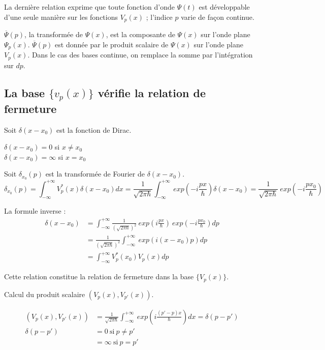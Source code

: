 \documentclass[12pt,a4paper,titlepage]{book}
\begin{document}
La dernière relation exprime que toute fonction d'onde $\Psi (t)$ est développable d'une seule manière sur les fonctions $V_p (x)$ ; l'indice $p$ varie de façon continue.

$\overline{\Psi} (p)$, la transformée de $\Psi (x)$, est la composante de $\Psi (x)$ sur l'onde plane $\Psi_p (x)$. $\overline{\Psi} (p)$ est donnée par le produit scalaire de $\Psi (x)$ sur l'onde plane $V_p (x)$. Dans le cas des bases continue, on remplace la somme par l'intégration sur $dp$.

\subsection{La base $\lbrace v_p (x) \rbrace$ vérifie la relation de fermeture}

Soit $\delta (x-x_0)$ est la fonction de Dirac.
\begin{center}
$\delta (x-x_0) = 0$ si $x \neq x_0$\\
$\delta (x-x_0) = \infty$ si $x = x_0$
\end{center}

Soit $\delta_{x_0} (p)$ est la transformée de Fourier de $\delta (x-x_0)$.
\begin{equation*}
\delta_{x_0} (p) = \int_{- \infty}^{+ \infty} V_p^* (x) \delta (x-x_0) dx = \frac{1}{\sqrt{2 \pi \hbar}} \int_{- \infty}^{+ \infty} ~exp \left( -i \frac{px}{\hbar} \right) \delta (x-x_0) = \frac{1}{\sqrt{2 \pi \hbar}} ~exp \left( -i \frac{px_0}{\hbar} \right)
\end{equation*}

La formule inverse :
\begin{align*}
\delta (x-x_0) &= \int_{- \infty}^{+ \infty} \frac{1}{(\sqrt{2 \pi \hbar})^2} ~exp \left( i \frac{px}{\hbar} \right) ~exp \left( -i \frac{px_0}{\hbar} \right) dp \\
&= \frac{1}{(\sqrt{2 \pi \hbar})^2} \int_{- \infty}^{+ \infty} ~exp \left( i (x-x_0)p \right) dp\\
&= \int_{- \infty}^{+ \infty} V_p^* (x_0) V_p (x) dp
\end{align*}

Cette relation constitue la relation de fermeture dans la base $\lbrace V_p (x) \rbrace$.

Calcul du produit scalaire $\left( V_p (x), V_{p'} (x) \right)$.

\begin{align*}
\left( V_p (x), V_{p'} (x) \right) &= \frac{1}{\sqrt{2 \pi \hbar}} \int_{- \infty}^{+ \infty} ~exp \left( i \frac{(p'-p)x}{\hbar} \right) dx = \delta (p-p')\\
\delta (p-p') &= 0 ~\text{si}~ p \neq p'\\
&= \infty ~\text{si}~ p = p'
\end{align*}
\end{document}
